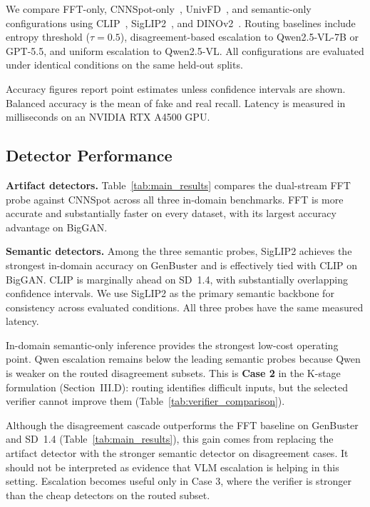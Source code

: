 \documentclass{ieeeaccess}
\begin{document}
We compare FFT-only, CNNSpot-only~\cite{wang2020cnn}, UnivFD~\cite{ojha2023fakedetect},
and semantic-only configurations using CLIP~\cite{pmlr-v139-radford21a},
SigLIP2~\cite{tschannen2025siglip2}, and DINOv2~\cite{oquab2023dinov2}. Routing
baselines include entropy threshold ($\tau = 0.5$), disagreement-based escalation to Qwen2.5-VL-7B or GPT-5.5, and uniform escalation to Qwen2.5-VL. All configurations
are evaluated under identical conditions on the same held-out splits.

Accuracy figures report point estimates unless confidence intervals are shown. Balanced accuracy is the mean of fake and real recall. Latency
is measured in milliseconds on an NVIDIA RTX A4500 GPU.

\subsection{Detector Performance}


\textbf{Artifact detectors.} Table~\ref{tab:main_results} compares the dual-stream
FFT probe against CNNSpot across all three in-domain benchmarks. FFT is more accurate
and substantially faster on every dataset, with its largest accuracy advantage on
BigGAN.

\textbf{Semantic detectors.} Among the three semantic probes, SigLIP2 achieves the
strongest in-domain accuracy on GenBuster and is effectively tied with CLIP on BigGAN.
CLIP is marginally ahead on SD~1.4, with substantially overlapping confidence intervals.
We use SigLIP2 as the primary semantic backbone for consistency across evaluated
conditions. All three probes have the same measured latency.

In-domain semantic-only inference provides the strongest low-cost operating point.
Qwen escalation remains below the leading semantic probes because Qwen is weaker on
the routed disagreement subsets. This is \textbf{Case 2} in the K-stage formulation
(Section~III.D): routing identifies difficult inputs, but the selected verifier cannot
improve them (Table~\ref{tab:verifier_comparison}).

Although the disagreement cascade outperforms the FFT baseline on GenBuster and
SD~1.4 (Table~\ref{tab:main_results}), this gain comes from replacing the
artifact detector with the stronger semantic detector on disagreement cases.
It should not be interpreted as evidence that VLM escalation is helping in this
setting. Escalation becomes useful only in Case 3, where the verifier is stronger
than the cheap detectors on the routed subset.
\end{document}
